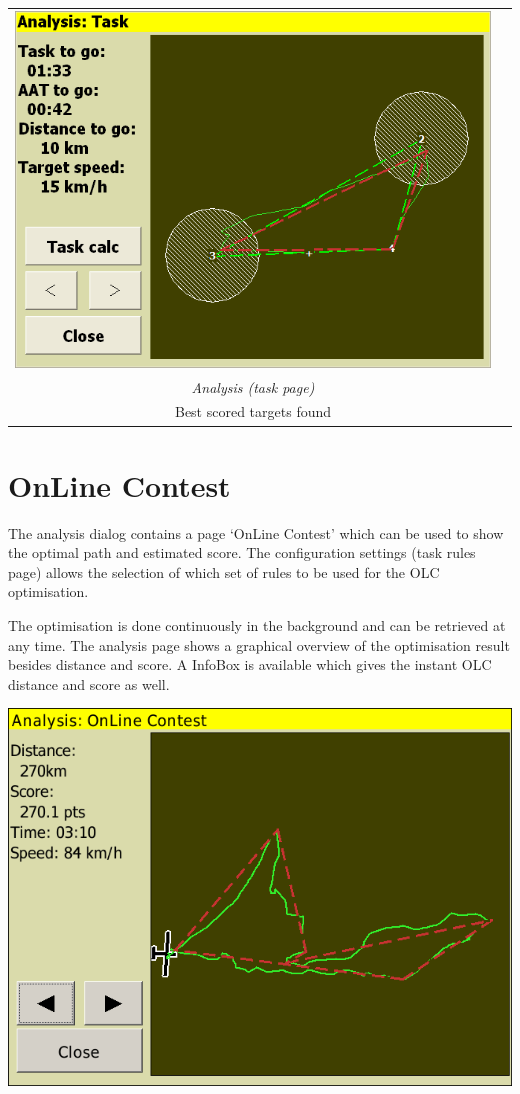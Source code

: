 \begin{maxipage}
\begin{center}
\begin{longtable}{|c|c|}
\midrule
\includegraphics[angle=0,width=0.45\linewidth,keepaspectratio='true']{figures/faat12.png} &  \\
{\em Analysis (task page)} &  \\
Best scored targets found &  \\

\bottomrule
\end{longtable}
\end{center}
\end{maxipage}

\section{OnLine Contest}

The analysis dialog contains a page `OnLine Contest' which can be
used to show the optimal path and estimated score.  The configuration settings  
(task rules page) allows the selection of which set of rules to be used for the
OLC optimisation.

The optimisation is done continuously in the background and can be retrieved at
any time. The analysis page shows a graphical overview of the optimisation
result besides distance and score. A InfoBox is available which gives the
instant OLC distance and score as well.

\begin{center}
\includegraphics[angle=0,width=0.8\linewidth,keepaspectratio='true']{figures/shot-olc.png}
\end{center}

